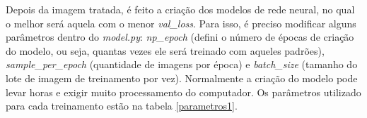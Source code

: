 	\begin{figure}[H]
		\centering
\end{figure}

Depois da imagem tratada, é feito a criação dos modelos de rede neural, no qual o melhor será aquela com o menor \textit{val\_loss}. Para isso, é preciso modificar alguns parâmetros dentro do \textit{model.py}: \textit{np\_epoch} (defini o número de épocas de criação do modelo, ou seja, quantas vezes ele será treinado com aqueles padrões), \textit{sample\_per\_epoch} (quantidade de imagens por época) e \textit{batch\_size} (tamanho do lote de imagem de treinamento por vez). Normalmente a criação do modelo pode levar horas e exigir muito processamento do computador. Os parâmetros utilizado para cada treinamento estão na tabela \ref{parametros1}.

